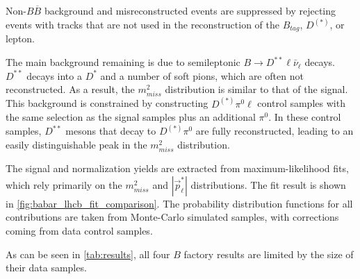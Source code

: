 Non-$B \overline{B}$ background and misreconstructed events are suppressed by
rejecting events with tracks that are not used in the reconstruction of the
$B_{tag}$, $D^{(*)}$, or lepton.

The main background remaining is due to semileptonic $B \rightarrow D^{**} \ell
\bar{\nu}_\ell$ decays.
$D^{**}$ decays into a $D^{*}$ and a number of soft pions, which are often not
reconstructed.
As a result, the $m^2_{miss}$ distribution is similar to that of the signal.
This background is constrained by constructing $D^{(*)}\pi^0\ell$ control
samples with the same selection as the signal samples plus an additional
$\pi^0$.
In these control samples, $D^{**}$ mesons that decay to $D^{(*)} \pi^0$ are
fully reconstructed, leading to an easily distinguishable peak in the
$m^2_{miss}$ distribution.

The signal and normalization yields are extracted from maximum-likelihood fits,
which rely primarily on the $m^2_{miss}$ and $|\vec{p}^*_\ell|$ distributions.
The fit result is shown in \autoref{fig:babar_lhcb_fit_comparison}.
The probability distribution functions for all contributions are taken from
Monte-Carlo simulated samples, with corrections coming from data control
samples.

As can be seen in \autoref{tab:results}, all four $B$ factory results are
limited by the size of their data samples.
